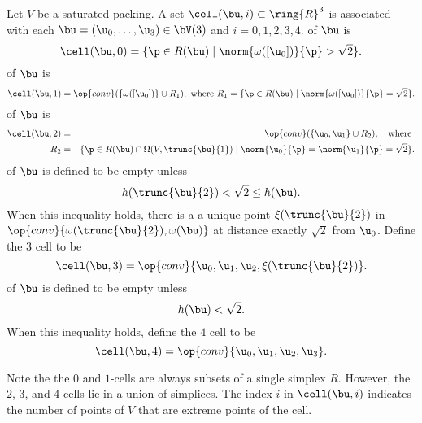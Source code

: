 \begin{definition} 
Let $V$ be a saturated packing.  
A set $\cell(\bu,i)\subset\ring{R}^3$ is associated with each $\bu=( \u_0,\ldots,
\u_3)\in \bV(3)$ and $i=0,1,2,3,4$.  
\hfill\break\smallskip {} of $\bu$
is
\begin{displaymath} 
\cell(\bu,0) = \{\p\in R(\bu) \mid \norm{\omega([ \u_0])}{\p} > \sqrt2\}.
\end{displaymath}
\bigskip
{} of $\bu$ is 
\begin{displaymath} 
\cell(\bu,1) = \op{conv}(\{\omega([ \u_0])\}\cup R_1),\hbox{ where } R_1 = \{\p \in R(\bu) \mid \norm{\omega([ \u_0])}{\p}= \sqrt2\}.
\end{displaymath}
%
%
%
\bigskip
{} of $\bu$ is
\begin{eqnarray*} 
\cell(\bu,2) &=& \op{conv}( \{\u_0, \u_1\}\cup R_2),\quad\text{where }  \vspace{6pt}\\
R_2 &=& \{\p \in R(\bu)\cap \Omega(V,\trunc{\bu}{1}) \mid \norm{ \u_0}{\p}=\norm{ \u_1}{\p} =\sqrt2\}.
\end{eqnarray*}
\bigskip
{} of $\bu$ is defined to be empty unless 
\begin{displaymath} 
h(\trunc{\bu}{2}) <\sqrt2 \le h(\bu).
\end{displaymath}
When this inequality holds, there is a a unique point $\xi(\trunc{\bu}{2})$ in
$\op{conv}\{\omega(\trunc{\bu}{2}),\omega(\bu)\}$ at distance exactly
$\sqrt2$ from $ \u_0$.  Define the $3$ cell to be
\begin{displaymath} 
\cell(\bu,3) = \op{conv}\{ \u_0, \u_1, \u_2,\xi(\trunc{\bu}{2})\}.
\end{displaymath}
\bigskip
{} of $\bu$ is defined to be empty unless
\begin{displaymath} 
h(\bu) <\sqrt2.
\end{displaymath}
When this inequality holds, define the $4$ cell to be
\begin{displaymath} 
\cell(\bu,4) = \op{conv}\{ \u_0, \u_1, \u_2, \u_3\}.
\end{displaymath}
\end{definition}
%

Note the the $0$ and $1$-cells are always subsets of a single simplex
$R$.  However, the $2$, $3$, and $4$-cells lie in a union of
simplices.  The index $i$ in  $\cell(\bu,i)$ indicates the number
of points of $V$ that are extreme points of the cell. 

